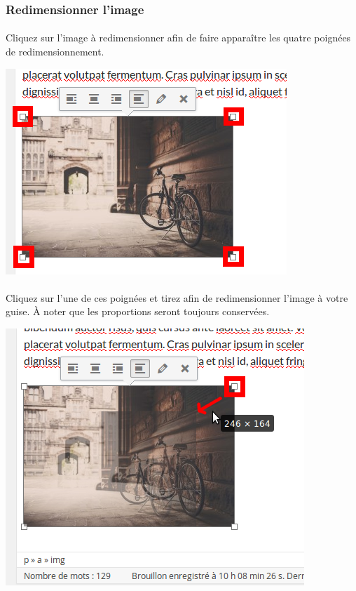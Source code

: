 \documentclass[10pt,a4paper]{article}
\begin{document}
\subsubsection{Redimensionner l'image}
\paragraph{}Cliquez sur l'image à redimensionner afin de faire apparaître les quatre poignées de redimensionnement.
\begin{center}
\includegraphics[scale=0.3]{img/0105.png}
\end{center}
\paragraph{}Cliquez sur l'une de ces poignées et tirez afin de redimensionner l'image à votre guise. À noter que les proportions seront toujours conservées.
\begin{center}
\includegraphics[scale=0.3]{img/0106.png}
\end{center}
\newpage
\end{document}
